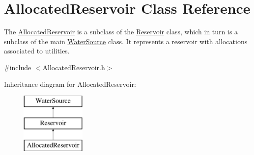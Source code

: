 \hypertarget{classAllocatedReservoir}{}\section{Allocated\+Reservoir Class Reference}
\label{classAllocatedReservoir}


The {\ttfamily \mbox{\hyperlink{classAllocatedReservoir}{Allocated\+Reservoir}}} is a subclass of the {\ttfamily \mbox{\hyperlink{classReservoir}{Reservoir}}} class, which in turn is a subclass of the main {\ttfamily \mbox{\hyperlink{classWaterSource}{Water\+Source}}} class. It represents a reservoir with allocations associated to utilities.  




{\ttfamily \#include $<$Allocated\+Reservoir.\+h$>$}

Inheritance diagram for Allocated\+Reservoir\+:\begin{figure}[H]
\begin{center}
\leavevmode
\includegraphics[height=3.000000cm]{classAllocatedReservoir}
\end{center}
\end{figure}
